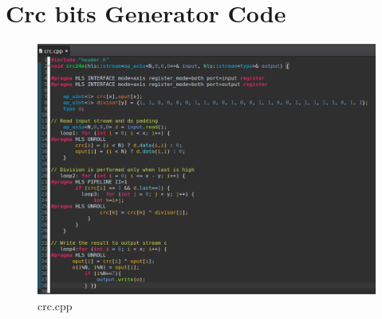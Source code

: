 \documentclass{article}
\begin{document}
\section{Crc bits Generator Code}
\vspace{1cm}
\begin{figure}[h]
\centering
\includegraphics[width=1.1\textwidth]{figs/p1crc.png}
    \caption{crc.cpp}
    \label{fig:my_label}
\end{figure}
\vspace{1cm}
\end{document}
